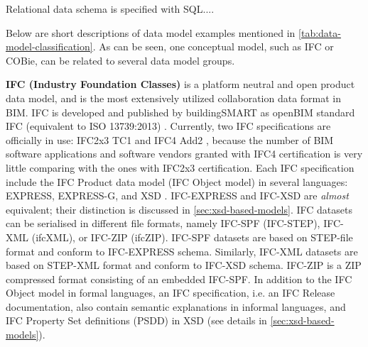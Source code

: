 Relational data schema is specified with SQL....



Below are short descriptions of data model examples mentioned in \autoref{tab:data-model-classification}.
As can be seen, one conceptual model, such as IFC or COBie, can be related to several data model groups.


\textbf{IFC (Industry Foundation Classes)} is a platform neutral and open product data model, and is the most extensively utilized collaboration data format in BIM.
IFC is developed and published by buildingSMART as openBIM standard IFC (equivalent to ISO 13739:2013) \cite{iso2013ifc}.
Currently, two IFC specifications are officially in use: IFC2x3 TC1 \cite{liebich2007ifc2x3} and IFC4 Add2 \cite{liebich2016ifc4}, because the number of BIM software applications and software vendors granted with IFC4 certification is very little comparing with the ones with IFC2x3 certification.
Each IFC specification include the IFC Product data model (IFC Object model) in several languages: EXPRESS, EXPRESS-G, and XSD \cite{liebich2007ifc2x3, liebich2016ifc4}.
IFC-EXPRESS and IFC-XSD are \emph{almost} equivalent; their distinction is discussed in \autoref{sec:xsd-based-models}.
IFC datasets can be serialised in different file formats, namely IFC-SPF (IFC-STEP), IFC-XML (ifcXML), or IFC-ZIP (ifcZIP).
IFC-SPF datasets are based on STEP-file format and conform to IFC-EXPRESS schema.
Similarly, IFC-XML datasets are based on STEP-XML format and conform to IFC-XSD schema.
IFC-ZIP is a ZIP compressed format consisting of an embedded IFC-SPF.
In addition to the IFC Object model in formal languages, an IFC specification, i.e. an IFC Release documentation, also contain semantic explanations in informal languages, and IFC Property Set definitions (PSDD) in XSD (see details in \ref{sec:xsd-based-models}).


